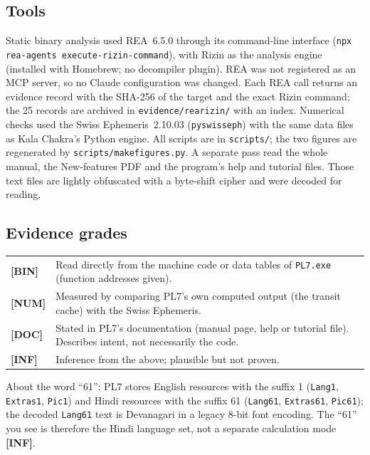 \documentclass[11pt, a4paper]{article}
\newcommand{\gradetag}[2]{{\color{#1}\textsf{\scriptsize\textbf{[#2]}}}}
\newcommand{\tagBIN}{\gradetag{midseapurple}{BIN}}
\newcommand{\tagNUM}{\gradetag{midseagreen}{NUM}}
\newcommand{\tagDOC}{\gradetag{headerblue}{DOC}}
\newcommand{\tagINF}{\gradetag{midseaorange!85!black}{INF}}
\DeclareRobustCommand{\_}{\textunderscore\allowbreak}
\begin{document}
\subsection{Tools}

Static binary analysis used REA~6.5.0 \parencite{morluto2026rea} through its command-line
interface (\texttt{npx rea-agents execute-rizin-command}), with Rizin as the analysis engine
(installed with Homebrew; no decompiler plugin). REA was not registered as an MCP server,
so no Claude configuration was changed. Each REA call returns an evidence record with the
SHA-256 of the target and the exact Rizin command; the 25 records are archived in
\texttt{evidence/rea\_rizin/} with an index. Numerical checks used the Swiss Ephemeris~2.10.03
(\texttt{pyswisseph}) with the same \texttt{\_18} data files as Kala Chakra's Python engine.
All scripts are in \texttt{scripts/}; the two figures are regenerated by
\texttt{scripts/make\_figures.py}. A separate pass read the whole manual, the
New-features PDF and the program's help and tutorial files. Those text files are lightly
obfuscated with a byte-shift cipher and were decoded for reading.

\subsection{Evidence grades}
\label{sec:grades}

\begin{tabularx}{\textwidth}{l X}
  \tagBIN & Read directly from the machine code or data tables of \texttt{PL7.exe}
  (function addresses given). \\
  \tagNUM & Measured by comparing PL7's own computed output (the transit cache) with the
  Swiss Ephemeris. \\
  \tagDOC & Stated in PL7's documentation (manual page, help or tutorial file). Describes
  intent, not necessarily the code. \\
  \tagINF & Inference from the above; plausible but not proven. \\
\end{tabularx}

\begin{notebox}\ksimple About the word ``61'': PL7 stores English resources with the suffix
1 (\texttt{Lang1}, \texttt{Extras1}, \texttt{Pic1}) and Hindi resources with the suffix 61
(\texttt{Lang61}, \texttt{Extras61}, \texttt{Pic61}); the decoded \texttt{Lang61} text is
Devanagari in a legacy 8-bit font encoding. The ``61'' you see is therefore the Hindi
language set, not a separate calculation mode \tagINF.\end{notebox}
\end{document}
